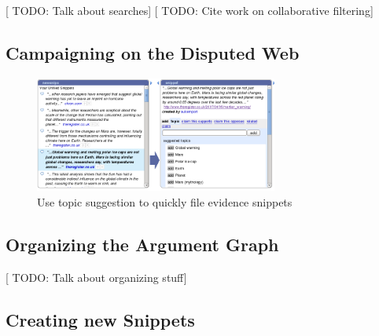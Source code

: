 \documentclass{chi2009}
\newcommand{\todo}[1]{{[\color{blue} TODO: #1]}}
\begin{document}
\todo{Talk about searches}
\todo{Cite work on collaborative filtering}


\subsection{Campaigning on the Disputed Web}

\begin{figure}[tb]
	\begin{center}
	\includegraphics[width=8cm]{../screenshots/v2_sniptopic.png}
	\caption{Use topic suggestion to quickly file evidence snippets}
	\label{sniptopic}
	\end{center}
\end{figure}

\subsection{Organizing the Argument Graph}



\todo{Talk about organizing stuff}

\subsection{Creating new Snippets}
\label{newsnippet}
\end{document}
